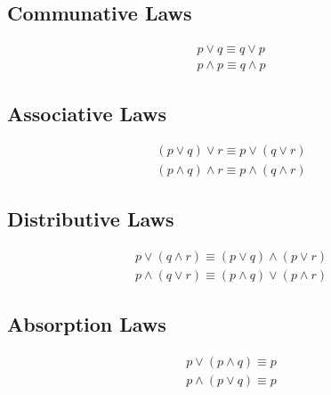 \documentclass[12pt]{article}
\begin{document}
\subsection{Communative Laws}

\begin{subequations}\label{communative}
\begin{align}
p \lor q \equiv q \lor p\label{comm_first}\\
p \wedge p \equiv q \wedge p\label{comm_second}
\end{align}
\end{subequations}

\subsection{Associative Laws}

\begin{subequations}\label{associative}
\begin{align}
(p \lor q) \lor r \equiv p \lor (q \lor r)\label{ass_first}\\
(p \wedge q) \wedge r \equiv p \wedge (q \wedge r)\label{ass_second}
\end{align}
\end{subequations}

\subsection{Distributive Laws}

\begin{subequations}\label{distributive}
\begin{align}
p \lor (q \wedge r) \equiv (p \lor q) \wedge (p \lor r)\label{distr_first}\\
p \wedge (q \lor r) \equiv (p \wedge q) \lor (p \wedge r)\label{distr_second}
\end{align}
\end{subequations}

\subsection{Absorption Laws}

\begin{subequations}\label{absorption}
\begin{align}
p \lor (p \wedge q) \equiv p\label{absorb_first}\\
p \wedge (p \lor q) \equiv p\label{absorb_second}
\end{align}
\end{subequations}
\end{document}
